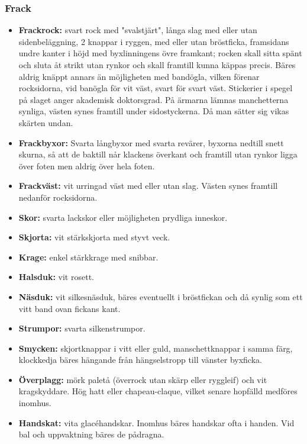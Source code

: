     \subsubsection*{\textbf{Frack}}
    \begin{itemize}
    
    \item[]\textbf{Frackrock:} svart rock med "svalstjärt", långa slag med eller utan sidenbeläggning, 2 knappar i ryggen, med eller utan bröstficka, framsidans undre kanter i höjd med byxlinningens övre framkant; rocken skall sitta spänt och sluta åt strikt utan rynkor och skall framtill kunna käppas precis. Bäres aldrig knäppt annars än möjligheten med bandögla, vilken förenar rocksidorna, vid banögla för vit väst, svart för svart väst. Stickerier i spegel på slaget anger akademisk doktorsgrad. På ärmarna lämnas manchetterna synliga, västen synes framtill under sidostyckerna. Då man sätter sig vikas skärten undan.

    \item[]\textbf{Frackbyxor:} Svarta långbyxor med svarta revärer, byxorna nedtill snett skurna, så att de baktill når klackens överkant och framtill utan rynkor ligga över foten men aldrig över hela foten.

    \item[]\textbf{Frackväst:} vit urringad väst med eller utan slag. Västen synes framtill nedanför rocksidorna.

    \item[]\textbf{Skor:} svarta lackskor eller möjligheten prydliga inneskor.
    
    \item[]\textbf{Skjorta:} vit stärkskjorta med styvt veck.

    \item[]\textbf{Krage:} enkel stärkkrage med snibbar.

    \item[]\textbf{Halsduk:} vit rosett.

    \item[]\textbf{Näsduk:} vit silkesnäsduk, bäres eventuellt i bröstfickan och då synlig som ett vitt band ovan fickans kant.

    \item[]\textbf{Strumpor:} svarta silkenstrumpor.

    \item[]\textbf{Smycken:} skjortknappar i vitt eller guld, manschettknappar i samma färg, klockkedja bäres hängande från hängselstropp till vänster byxficka.

    \item[]\textbf{Överplagg:} mörk paletå (överrock utan skärp eller ryggleif) och vit kragskyddare. Hög hatt eller chapeau-claque, vilket senare hopfälld medföres inomhus.

    \item[]\textbf{Handskat:} vita glacéhandskar. Inomhus bäres handskar ofta i handen. Vid bal och uppvaktning bäres de pådragna.

    \end{itemize}

